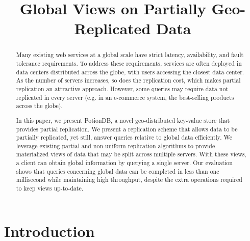 \documentclass[sigplan,10pt]{acmart}
\begin{document}

\title{Global Views on Partially Geo-Replicated Data}

%

\begin{abstract}

Many existing web services at a global scale have strict latency, availability, and fault tolerance requirements.
To address these requirements,  services are often deployed in data centers distributed 
across the globe, with users accessing the closest data center.
As the number of servers increases, so does the replication cost, which makes partial replication an attractive approach.
However, some queries may require data not replicated in every server (e.g. in an e-commerce system, the best-selling products across the globe).

In this paper, we present PotionDB, a novel geo-distributed key-value store that provides partial replication.
We present a replication scheme that allows data to be partially replicated, yet still, answer queries relative to global data efficiently.
We leverage existing partial and non-uniform replication algorithms to provide materialized views of data that may be split across multiple servers.
With these views, a client can obtain global information by querying a single server.
Our evaluation shows that queries concerning global data can be completed in less than one millisecond while maintaining high throughput, despite the extra operations required to keep views up-to-date. 

\end{abstract}

\maketitle
\pagestyle{plain}

\section{Introduction}
\label{sec:introduction}

\end{document}
